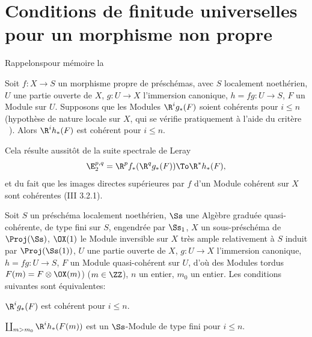 \section[Conditions de finitude universelles]
{Conditions de finitude universelles pour un morphisme non propre} \label{XII.5} Rappelons\pageoriginale pour m\'emoire la \setcounter{equation}{25}

\begin{proposition} \label{XII.5.1}
Soit $f:X\to S$ un morphisme propre de pr\'esch\'emas, avec $S$ localement noeth\'erien, $U$ une partie ouverte de $X$, $g:U\to X$ l'immersion canonique, $h=fg:U\to S$, $F$ un Module sur $U$. Supposons que les Modules $\R^ig_\ast(F)$ soient coh\'erents pour $i\leq n$ (hypoth\`ese de nature locale sur $X$, qui se v\'erifie pratiquement \`a l'aide du crit\`ere ~). Alors $\R^ih_\ast(F)$ est coh\'erent pour $i\leq n$.
\end{proposition}

Cela r\'esulte aussit\^{o}t de la suite spectrale de Leray
\steco
\begin{equation} \label{eq:XII.26} {} \E_2^{p, q}=\R^pf_\ast(\R^qg_\ast(F)) \To \R^\ast h_\ast(F),
\end{equation}
et du fait que les images directes sup\'erieures par $f$ d'un Module coh\'erent sur $X$ sont coh\'erentes (\EGA III 3.2.1).

\begin{proposition} \label{XII.5.2}
Soit $S$ un pr\'esch\'ema localement noeth\'erien, $\Ss$ une Alg\`ebre gradu\'ee quasi-coh\'erente, de type fini sur $S$, engendr\'ee par $\Ss_1$, $X$ un sous-pr\'esch\'ema de $\Proj(\Ss)$, $\OX(1)$ le Module inversible sur $X$ tr\`es ample relativement \`a $S$ induit par $\Proj(\Ss(1))$, $U$ une partie ouverte de $X$, $g:U\to X$ l'immersion canonique, $h=fg:U\to S$, $F$ un Module quasi-coh\'erent sur $U$, d'o\`u des Modules tordus $F(m)=F\otimes \OX(m)$) ($m\in\ZZ$), $n$ un entier, $m_0$ un entier. Les conditions suivantes sont \'equivalentes:
\begin{enumeratei}
\item
$\R^ig_\ast(F)$ est coh\'erent pour $i\leq n$.
\item
$\coprod_{m>m_0}\R^ih_\ast(F(m))$ est un $\Ss$-Module de type fini pour $i\leq n$.
\end{enumeratei}
\end{proposition}

